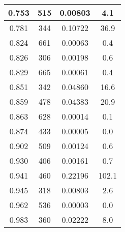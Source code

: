 \begin{longtable}{c | c | c | c}
0.753 &  515 & 0.00803 &  4.1 \\ \hline 
0.781 &  344 & 0.10722 & 36.9 \\ \hline 
0.824 &  661 & 0.00063 &  0.4 \\ \hline 
0.826 &  306 & 0.00198 &  0.6 \\ \hline 
0.829 &  665 & 0.00061 &  0.4 \\ \hline 
0.851 &  342 & 0.04860 & 16.6 \\ \hline 
0.859 &  478 & 0.04383 & 20.9 \\ \hline 
0.863 &  628 & 0.00014 &  0.1 \\ \hline 
0.874 &  433 & 0.00005 &  0.0 \\ \hline 
0.902 &  509 & 0.00124 &  0.6 \\ \hline 
0.930 &  406 & 0.00161 &  0.7 \\ \hline 
0.941 &  460 & 0.22196 & 102.1 \\ \hline 
0.945 &  318 & 0.00803 &  2.6 \\ \hline 
0.962 &  536 & 0.00003 &  0.0 \\ \hline 
0.983 &  360 & 0.02222 &  8.0 \\ \hline 
\end{longtable}

